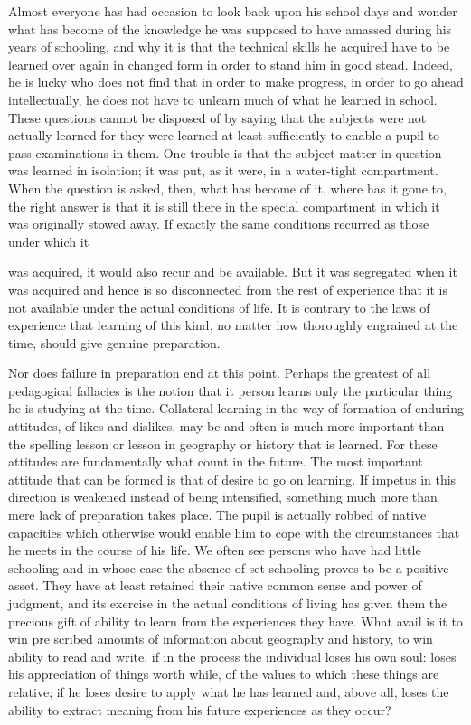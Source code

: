 Almost everyone has had occasion to look back upon his school days and wonder 
what has become of the knowledge he was supposed to have amassed during his years of 
schooling, and why it is that the technical skills he acquired have to be learned over again 
in changed form in order to stand him in good stead. Indeed, he is lucky who does not 
find that in order to make progress, in order to go ahead intellectually, he does not have 
to unlearn much of what he learned in school. These questions cannot be disposed of by 
saying that the subjects were not actually learned for they were learned at least 
sufficiently to enable a pupil to pass examinations in them. One trouble is that the 
subject-matter in question was learned in isolation; it was put, as it were, in a water-tight 
compartment. When the question is asked, then, what has become of it, where has it gone 
to, the right answer is that it is still there in the special compartment in which it was 
originally stowed away. If exactly the same conditions recurred as those under which it 



was acquired, it would also recur and be available. But it was segregated when it was 
acquired and hence is so disconnected from the rest of experience that it is not available 
under the actual conditions of life. It is contrary to the laws of experience that learning of 
this kind, no matter how thoroughly engrained at the time, should give genuine 
preparation. 

Nor does failure in preparation end at this point. Perhaps the greatest of all 
pedagogical fallacies is the notion that it person learns only the particular thing he is 
studying at the time. Collateral learning in the way of formation of enduring attitudes, of 
likes and dislikes, may be and often is much more important than the spelling lesson or 
lesson in geography or history that is learned. For these attitudes are fundamentally what 
count in the future. The most important attitude that can be formed is that of desire to go 
on learning. If impetus in this direction is weakened instead of being intensified, 
something much more than mere lack of preparation takes place. The pupil is actually 
robbed of native capacities which otherwise would enable him to cope with the 
circumstances that he meets in the course of his life. We often see persons who have had 
little schooling and in whose case the absence of set schooling proves to be a positive 
asset. They have at least retained their native common sense and power of judgment, and 
its exercise in the actual conditions of living has given them the precious gift of ability to 
learn from the experiences they have. What avail is it to win pre scribed amounts of 
information about geography and history, to win ability to read and write, if in the 
process the individual loses his own soul: loses his appreciation of things worth while, of 
the values to which these things are relative; if he loses desire to apply what he has 
learned and, above all, loses the ability to extract meaning from his future experiences as 
they occur? 

